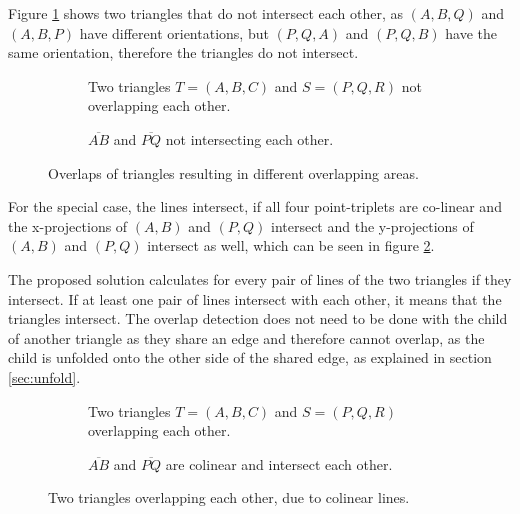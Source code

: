 \documentclass[draft,final]{vutinfth} %
\begin{document}
Figure \ref{fig:nooverlap} shows two triangles that do not intersect each other, as $(A,B,Q)$ and $(A,B,P)$ have different orientations, but $(P,Q,A)$ and $(P,Q,B)$ have the same orientation, therefore the triangles do not intersect.

\begin{figure}
\centering
\begin{subfigure}[t]{.4\textwidth}
	
  \caption{Two triangles $T = (A,B,C)$ and $S = (P,Q,R)$ not overlapping each other.}
\end{subfigure}%
\hspace{.1\textwidth}
\begin{subfigure}[t]{.4\textwidth}
	
	\caption{$\overline{AB}$ and $\overline{PQ}$ not intersecting each other.}
\end{subfigure}
\caption{Overlaps of triangles resulting in different overlapping areas.}
\label{fig:nooverlap}
\end{figure}

For the special case, the lines intersect, if all four point-triplets are co-linear and the x-projections of $(A,B)$ and $(P,Q)$ intersect and the y-projections of $(A,B)$ and $(P,Q)$ intersect as well, which can be seen in figure \ref{fig:colinearoverlap}.

The proposed solution calculates for every pair of lines of the two triangles if they intersect. If at least one pair of lines intersect with each other, it means that the triangles intersect. The overlap detection does not need to be done with the child of another triangle as they share an edge and therefore cannot overlap, as the child is unfolded onto the other side of the shared edge, as explained in section \ref{sec:unfold}.

\begin{figure}
\centering
\begin{subfigure}[t]{.4\textwidth}
	
  \caption{Two triangles $T = (A,B,C)$ and $S = (P,Q,R)$ overlapping each other.}
\end{subfigure}%
\hspace{.1\textwidth}
\begin{subfigure}[t]{.4\textwidth}
	
	\caption{$\overline{AB}$ and $\overline{PQ}$ are colinear and intersect each other.}
\end{subfigure}
\caption{Two triangles overlapping each other, due to colinear lines.}
\label{fig:colinearoverlap}
\end{figure}
\end{document}
